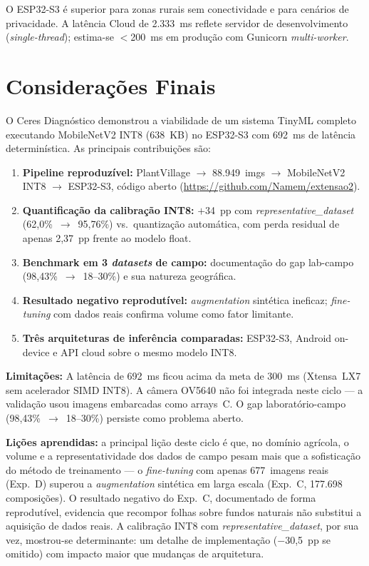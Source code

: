 \documentclass[12pt]{article}
\begin{document}
O ESP32-S3 é superior para zonas rurais sem conectividade e para cenários de
privacidade. A latência Cloud de 2.333~ms reflete servidor de desenvolvimento
(\textit{single-thread}); estima-se $<$200~ms em produção com Gunicorn \textit{multi-worker}.


\section{Considerações Finais}

O Ceres Diagnóstico demonstrou a viabilidade de um sistema TinyML completo
executando MobileNetV2 INT8 (638~KB) no ESP32-S3 com 692~ms de latência
determinística. As principais contribuições são:

\begin{enumerate}
  \item \textbf{Pipeline reproduzível:} PlantVillage $\to$ 88.949~imgs $\to$
        MobileNetV2 INT8 $\to$ ESP32-S3, código aberto
        (\url{https://github.com/Namem/extensao2}).
  \item \textbf{Quantificação da calibração INT8:} $+$34~pp com
        \textit{representative\_dataset} (62,0\%~$\to$~95,76\%) vs.\ quantização
        automática, com perda residual de apenas 2,37~pp frente ao modelo float.
  \item \textbf{Benchmark em 3 \textit{datasets} de campo:} documentação do gap
        lab-campo (98,43\%~$\to$~18--30\%) e sua natureza geográfica.
  \item \textbf{Resultado negativo reprodutível:} \textit{augmentation} sintética
        ineficaz; \textit{fine-tuning} com dados reais confirma volume como fator
        limitante.
  \item \textbf{Três arquiteturas de inferência comparadas:} ESP32-S3, Android
        on-device e API cloud sobre o mesmo modelo INT8.
\end{enumerate}

\textbf{Limitações:} A latência de 692~ms ficou acima da meta de 300~ms
(Xtensa~LX7 sem acelerador SIMD INT8). A câmera OV5640 não foi integrada neste
ciclo --- a validação usou imagens embarcadas como arrays~C. O gap
laboratório-campo (98,43\%~$\to$~18--30\%) persiste como problema aberto.

\textbf{Lições aprendidas:} a principal lição deste ciclo é que, no domínio
agrícola, o volume e a representatividade dos dados de campo pesam mais que a
sofisticação do método de treinamento --- o \textit{fine-tuning} com apenas
677~imagens reais (Exp.~D) superou a \textit{augmentation} sintética em larga escala
(Exp.~C, 177.698
composições). O resultado negativo do Exp.~C, documentado de forma reprodutível,
evidencia que recompor folhas sobre fundos naturais não substitui a aquisição de
dados reais. A calibração INT8 com \textit{representative\_dataset}, por sua vez,
mostrou-se determinante: um detalhe de implementação ($-$30,5~pp se omitido) com
impacto maior que mudanças de arquitetura.
\end{document}
